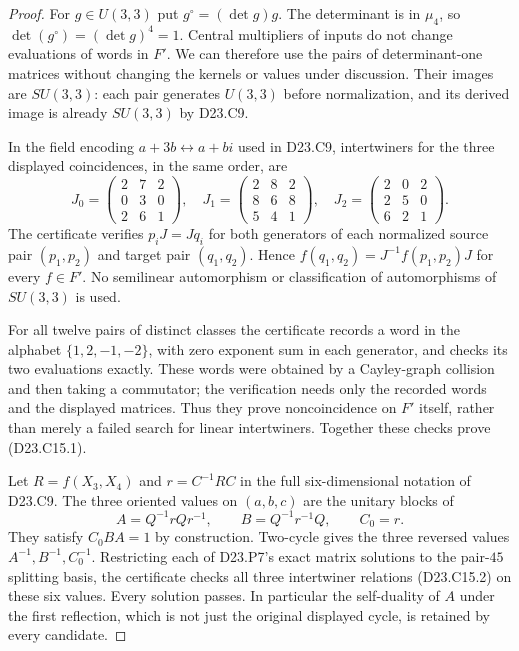 \begin{proof}
For $g\in U(3,3)$ put $g^\circ=(\det g)g$. The determinant is in
$\mu_4$, so $\det(g^\circ)=(\det g)^4=1$. Central multipliers of
inputs do not change evaluations of words in $F'$. We can therefore
use the pairs of determinant-one matrices without changing the
kernels or values under discussion. Their images are $SU(3,3)$:
each pair generates $U(3,3)$ before normalization, and its derived
image is already $SU(3,3)$ by D23.C9.

In the field encoding $a+3b\leftrightarrow a+bi$ used in D23.C9,
intertwiners for the three displayed coincidences, in the same
order, are
\[
 J_0=\begin{pmatrix}2&7&2\\0&3&0\\2&6&1\end{pmatrix},\quad
 J_1=\begin{pmatrix}2&8&2\\8&6&8\\5&4&1\end{pmatrix},\quad
 J_2=\begin{pmatrix}2&0&2\\2&5&0\\6&2&1\end{pmatrix}.
\tag{D23.C15.2}
\]
The certificate verifies $p_iJ=Jq_i$ for both generators of each
normalized source pair $(p_1,p_2)$ and target pair $(q_1,q_2)$.
Hence $f(q_1,q_2)=J^{-1}f(p_1,p_2)J$ for every $f\in F'$.
No semilinear automorphism or classification of automorphisms of
$SU(3,3)$ is used.

For all twelve pairs of distinct classes the certificate records a
word in the alphabet $\{1,2,-1,-2\}$, with zero exponent sum in
each generator, and checks its two evaluations exactly. These
words were obtained by a Cayley-graph collision and then taking
a commutator; the verification needs only the recorded words and
the displayed matrices. Thus they prove noncoincidence on $F'$
itself, rather than merely a failed search for linear intertwiners.
Together these checks prove (D23.C15.1).

Let $R=f(X_3,X_4)$ and $r=C^{-1}RC$ in the full six-dimensional
notation of D23.C9. The three oriented values on $(a,b,c)$ are the
unitary blocks of
\[
 A=Q^{-1}rQr^{-1},\qquad B=Q^{-1}r^{-1}Q,\qquad C_0=r.
\tag{D23.C15.3}
\]
They satisfy $C_0BA=1$ by construction. Two-cycle gives the three
reversed values $A^{-1},B^{-1},C_0^{-1}$. Restricting each of
D23.P7's exact matrix solutions to the pair-$45$ splitting basis,
the certificate checks all three intertwiner relations (D23.C15.2)
on these six values. Every solution passes. In particular the
self-duality of $A$ under the first reflection, which is not just
the original displayed cycle, is retained by every candidate.


\end{proof}
